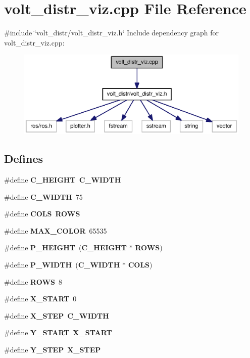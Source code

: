 \section{volt\-\_\-distr\-\_\-viz.\-cpp \-File \-Reference}
\label{volt__distr__viz_8cpp}
{\ttfamily \#include \char`\"{}volt\-\_\-distr/volt\-\_\-distr\-\_\-viz.\-h\char`\"{}}\*
\-Include dependency graph for volt\-\_\-distr\-\_\-viz.\-cpp\-:
\nopagebreak
\begin{figure}[H]
\begin{center}
\leavevmode
\includegraphics[width=350pt]{volt__distr__viz_8cpp__incl}
\end{center}
\end{figure}
\subsection*{\-Defines}
\begin{DoxyCompactItemize}
\item 
\#define {\bf \-C\-\_\-\-H\-E\-I\-G\-H\-T}~{\bf \-C\-\_\-\-W\-I\-D\-T\-H}
\item 
\#define {\bf \-C\-\_\-\-W\-I\-D\-T\-H}~75
\item 
\#define {\bf \-C\-O\-L\-S}~{\bf \-R\-O\-W\-S}
\item 
\#define {\bf \-M\-A\-X\-\_\-\-C\-O\-L\-O\-R}~65535
\item 
\#define {\bf \-P\-\_\-\-H\-E\-I\-G\-H\-T}~({\bf \-C\-\_\-\-H\-E\-I\-G\-H\-T} $\ast$ {\bf \-R\-O\-W\-S})
\item 
\#define {\bf \-P\-\_\-\-W\-I\-D\-T\-H}~({\bf \-C\-\_\-\-W\-I\-D\-T\-H} $\ast$ {\bf \-C\-O\-L\-S})
\item 
\#define {\bf \-R\-O\-W\-S}~8
\item 
\#define {\bf \-X\-\_\-\-S\-T\-A\-R\-T}~0
\item 
\#define {\bf \-X\-\_\-\-S\-T\-E\-P}~{\bf \-C\-\_\-\-W\-I\-D\-T\-H}
\item 
\#define {\bf \-Y\-\_\-\-S\-T\-A\-R\-T}~{\bf \-X\-\_\-\-S\-T\-A\-R\-T}
\item 
\#define {\bf \-Y\-\_\-\-S\-T\-E\-P}~{\bf \-X\-\_\-\-S\-T\-E\-P}
\end{DoxyCompactItemize}



